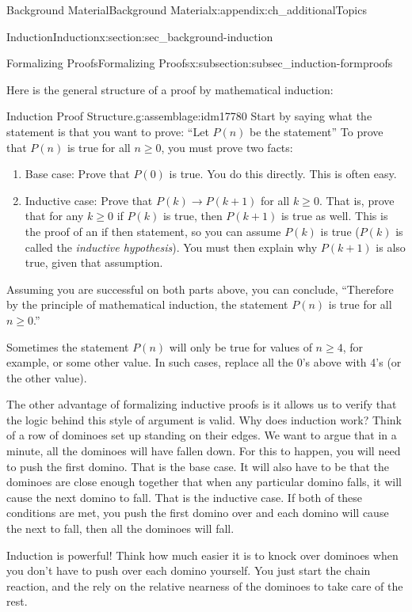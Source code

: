 \documentclass[oneside,10pt,]{book}
\numberwithin{equation}{chapter}
\def\imp{\rightarrow}
\begin{document}
\begin{appendixptx}{Background Material}{}{Background Material}{}{}{x:appendix:ch_additionalTopics}
\begin{sectionptx}{Induction}{}{Induction}{}{}{x:section:sec_background-induction}
\begin{subsectionptx}{Formalizing Proofs}{}{Formalizing Proofs}{}{}{x:subsection:subsec_induction-formproofs}
\par
Here is the general structure of a proof by mathematical induction:%
\begin{assemblage}{Induction Proof Structure.}{g:assemblage:idm17780}%
 Start by saying what the statement is that you want to prove: ``Let \(P(n)\) be the statement\textellipsis{}'' To prove that \(P(n)\) is true for all \(n \ge 0\), you must prove two facts:%
\begin{enumerate}
\item{}Base case: Prove that \(P(0)\) is true. You do this directly. This is often easy.%
\item{}Inductive case: Prove that \(P(k) \imp P(k+1)\) for all \(k \ge 0\). That is, prove that for any \(k \ge 0\) if \(P(k)\) is true, then \(P(k+1)\) is true as well. This is the proof of an if \textellipsis{} then \textellipsis{} statement, so you can assume \(P(k)\) is true (\(P(k)\) is called the \emph{inductive hypothesis}). You must then explain why \(P(k+1)\) is also true, given that assumption.%
\end{enumerate}
%
\par
Assuming you are successful on both parts above, you can conclude, ``Therefore by the principle of mathematical induction, the statement \(P(n)\) is true for all \(n \ge 0\).''%
\end{assemblage}
Sometimes the statement \(P(n)\) will only be true for values of \(n \ge 4\), for example, or some other value. In such cases, replace all the 0's above with 4's (or the other value).%
\par
The other advantage of formalizing inductive proofs is it allows us to verify that the logic behind this style of argument is valid. Why does induction work? Think of a row of dominoes set up standing on their edges. We want to argue that in a minute, all the dominoes will have fallen down. For this to happen, you will need to push the first domino. That is the base case. It will also have to be that the dominoes are close enough together that when any particular domino falls, it will cause the next domino to fall. That is the inductive case. If both of these conditions are met, you push the first domino over and each domino will cause the next to fall, then all the dominoes will fall.%
\par
Induction is powerful! Think how much easier it is to knock over dominoes when you don't have to push over each domino yourself. You just start the chain reaction, and the rely on the relative nearness of the dominoes to take care of the rest.%

\end{subsectionptx}
\end{sectionptx}
\end{appendixptx}
\end{document}
